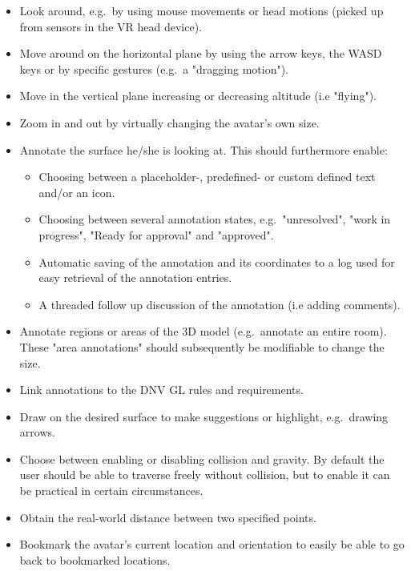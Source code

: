 \begin{itemize}
	\item Look around, e.g.~by using mouse movements or head motions (picked up from sensors in the VR head device).
	\item Move around on the horizontal plane by using the arrow keys, the WASD keys or by specific gestures (e.g.~a "dragging motion").
	\item Move in the vertical plane increasing or decreasing altitude (i.e "flying").
	\item Zoom in and out by virtually changing the avatar's own size.
	\item Annotate the surface he/she is looking at. This should furthermore enable:
	\begin{itemize}
		\item Choosing between a placeholder-, predefined- or custom defined text and/or an icon.
		\item Choosing between several annotation states,  e.g.~"unresolved", "work in progress", "Ready for approval" and "approved".
		\item Automatic saving of the annotation and its coordinates to a log used for easy retrieval of the annotation entries. 
		\item A threaded follow up discussion of the annotation (i.e adding comments).
	\end{itemize}
	\item Annotate regions or areas of the 3D model (e.g.~annotate an entire room). These "area annotations" should subsequently be modifiable to change the size. 
	\item Link annotations to the DNV GL rules and requirements.
	\item Draw on the desired surface to make suggestions or highlight, e.g.~drawing arrows.
	\item Choose between enabling or disabling collision and gravity. By default the user should be able to traverse freely without collision, but to enable it can be practical in certain circumstances.
	\item Obtain the real-world distance between two specified points.
	\item Bookmark the avatar's current location and orientation to easily be able to go back to bookmarked locations. 
\end{itemize}

